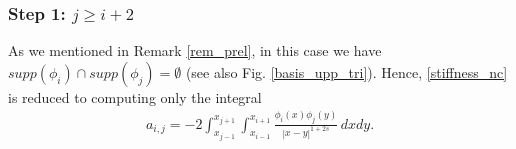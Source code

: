 
\subsubsection*{Step 1: $j\geq i+2$}
As we mentioned in Remark \ref{rem_prel}, in this case we have $supp(\phi_i)\cap supp(\phi_j) =\emptyset$ (see also Fig. \ref{basis_upp_tri}). Hence, \eqref{stiffness_nc} is reduced to computing only the integral
\begin{align}\label{elem_noint}
	a_{i,j}=-2 \int_{x_{j-1}}^{x_{j+1}}\int_{x_{i-1}}^{x_{i+1}}\frac{\phi_i(x)\phi_j(y)}{|x-y|^{1+2s}}\,dxdy.
\end{align}

